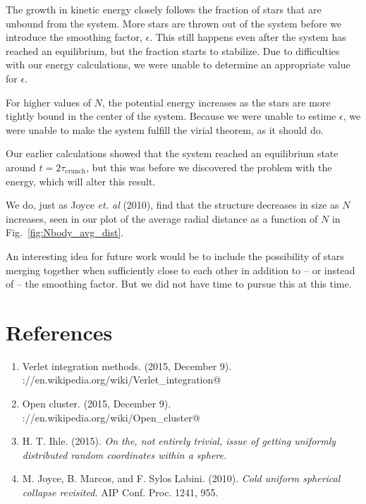 \documentclass{article}
\begin{document}
\begin{multicols}{2}
The growth in kinetic energy closely follows the fraction of stars that are unbound from the system. More stars are thrown out of the system before we introduce the smoothing factor, $\epsilon$. This still happens even after the system has reached an equilibrium, but the fraction starts to stabilize. Due to difficulties with our energy calculations, we were unable to determine an appropriate value for $\epsilon$.

For higher values of $N$, the potential energy increases as the stars are more tightly bound in the center of the system. Because we were unable to estime $\epsilon$, we were unable to make the system fulfill the virial theorem, as it should do. 

Our earlier calculations showed that the system reached an equilibrium state around $t = 2 \tau_{\mathrm{crunch}}$, but this was before we discovered the problem with the energy, which will alter this result.

We do, just as Joyce \textit{et. al} (2010), find that the structure decreases in size as $N$ increases, seen in our plot of the average radial distance as a function of $N$ in Fig.~\ref{fig:Nbody_avg_dist}.

An interesting idea for future work would be to include the possibility of stars merging together when sufficiently close to each other in addition to -- or instead of -- the smoothing factor. But we did not have time to pursue this at this time.

\section{References}

\begin{enumerate}
	\item Verlet integration methods. (2015, December 9). \\ \verb@https://en.wikipedia.org/wiki/Verlet_integration@
	\item Open cluster. (2015, December 9). \\ \verb@https://en.wikipedia.org/wiki/Open_cluster@
	\item H. T. Ihle. (2015). \textit{On the, not entirely trivial, issue of getting uniformly distributed random coordinates within a sphere.} 
	\item M. Joyce, B. Marcos, and F. Sylos Labini. (2010). \textit{Cold uniform spherical collapse revisited.} AIP Conf. Proc. 1241, 955.
\end{enumerate}




\end{multicols}
\end{document}
